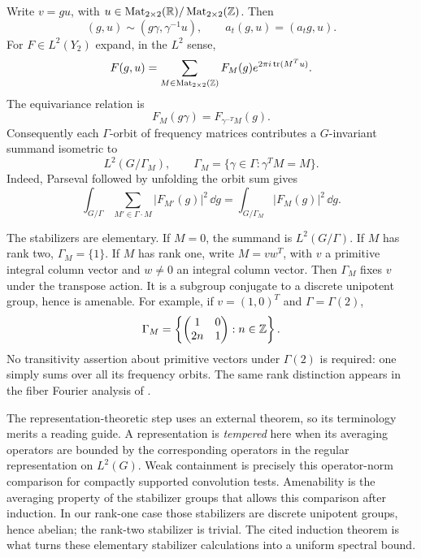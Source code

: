 Write $v=gu$, with $u\in\operatorname{Mat}_{2\times2}(\mathbb R)/
\operatorname{Mat}_{2\times2}(\mathbb Z)$. Then
\[
 (g,u)\sim(g\gamma,\gamma^{-1}u),\qquad
 a_t(g,u)=(a_tg,u).
\]
For $F\in L^2(Y_2)$ expand, in the $L^2$ sense,
\begin{equation}
 F(g,u)=\sum_{M\in\operatorname{Mat}_{2\times2}(\mathbb Z)}
   F_M(g)e^{2\pi i\operatorname{tr}(M^Tu)}.
 \label{eq:markedtorusfourier}
\end{equation}
The equivariance relation is
\begin{equation}
 F_M(g\gamma)=F_{\gamma^{-T}M}(g).
 \label{eq:markedtorusequivariance}
\end{equation}
Consequently each $\Gamma$-orbit of frequency matrices contributes
a $G$-invariant summand isometric to
\begin{equation}
 L^2(G/\Gamma_M),\qquad
 \Gamma_M=\{\gamma\in\Gamma:\gamma^TM=M\}.
 \label{eq:markedtorusinduction}
\end{equation}
Indeed, Parseval followed by unfolding the orbit sum gives
\[
 \int_{G/\Gamma}
       \sum_{M'\in\Gamma\cdot M}|F_{M'}(g)|^2\,\dd g
   =\int_{G/\Gamma_M}|F_M(g)|^2\,\dd g.
\]

The stabilizers are elementary. If $M=0$, the summand is
$L^2(G/\Gamma)$. If $M$ has rank two, $\Gamma_M=\{1\}$.
If $M$ has rank one, write $M=vw^T$, with $v$ a primitive
integral column vector and $w\ne0$ an integral column vector.
Then $\Gamma_M$ fixes $v$ under the transpose action. It is a
subgroup conjugate to a discrete unipotent group, hence is
amenable. For example, if $v=(1,0)^T$ and $\Gamma=\Gamma(2)$,
\[
 \Gamma_M=
 \left\{\begin{pmatrix}1&0\\2n&1\end{pmatrix}:n\in\mathbb Z\right\}.
\]
No transitivity assertion about primitive vectors under $\Gamma(2)$
is required: one simply sums over all its frequency orbits. The same
rank distinction appears in the fiber Fourier analysis of
\cite[Section~4, especially Lemma~4.3]{StrombergssonVishe}.

The representation-theoretic step uses an external theorem, so
its terminology merits a reading guide. A representation is
\emph{tempered} here when its averaging operators are bounded by
the corresponding operators in the regular representation on
$L^2(G)$. Weak containment is precisely this operator-norm
comparison for compactly supported convolution tests.
Amenability is the averaging property of the stabilizer groups
that allows this comparison after induction. In our rank-one
case those stabilizers are discrete unipotent groups, hence
abelian; the rank-two stabilizer is trivial. The cited induction
theorem is what turns these elementary stabilizer calculations
into a uniform spectral bound.

